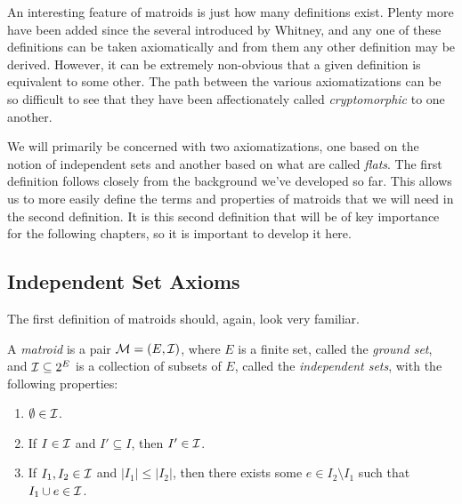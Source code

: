 \documentclass[12pt,oneside]{../../sfsuthesis}
\begin{document}
An interesting feature of matroids is just how many definitions exist.
Plenty more have been added since the several introduced by Whitney, and
any one of these definitions can be taken axiomatically and from them any other definition may be derived.
However, it can be extremely non-obvious that a given definition is equivalent to some other.
The path between the various axiomatizations can be so difficult to see that they have been affectionately called \textit{cryptomorphic} to one another.

We will primarily be concerned with two axiomatizations, one based on the notion of independent sets and another based on what are called \emph{flats}.
The first definition follows closely from the background we've developed so far.
This allows us to more easily define the terms and properties of matroids that we will need in the second definition.
It is this second definition that will be of key importance for the following chapters, so it is important to develop it here.

\subsection{Independent Set Axioms}

The first definition of matroids should, again, look very familiar.

\begin{definition}\th\label{def:MatroidIndpendentAxioms}
    A \emph{matroid} is a pair  \( \mathcal{M} = (E, \mathcal{I}) \), where \( E \) is a finite set, called the \emph{ground set}, and \( \mathcal{I} \subseteq 2^E \) is a collection of subsets of \( E \), called the \emph{independent sets}, with the following properties:
    \begin{enumerate}[label=(I\arabic*)]
        \item \( \emptyset \in \mathcal{I} \).
        \item If \( I \in \mathcal{I} \) and \( I' \subseteq I \), then \( I' \in \mathcal{I} \).
        \item If \( I_1, I_2 \in \mathcal{I} \) and \( |I_1| \leq |I_2|\), then there exists some \( e \in I_2 \setminus I_1 \)
              such that \( I_1 \cup e \in \mathcal{I} \).
    \end{enumerate}
\end{definition}
\end{document}
